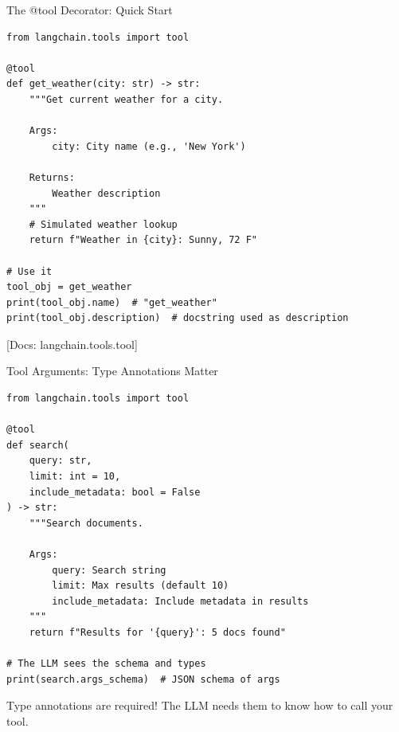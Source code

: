 \documentclass[aspectratio=169,11pt]{beamer}
\newcommand{\docref}[1]{{\scriptsize\color{docgray}[Docs: #1]}}
\begin{document}
\begin{frame}[fragile]{The @tool Decorator: Quick Start}
\begin{codebox}
\begin{lstlisting}
from langchain.tools import tool

@tool
def get_weather(city: str) -> str:
    """Get current weather for a city.

    Args:
        city: City name (e.g., 'New York')

    Returns:
        Weather description
    """
    # Simulated weather lookup
    return f"Weather in {city}: Sunny, 72 F"

# Use it
tool_obj = get_weather
print(tool_obj.name)  # "get_weather"
print(tool_obj.description)  # docstring used as description
\end{lstlisting}
\end{codebox}

\textcolor{docgray}{\docref{langchain.tools.tool}}
\end{frame}

\begin{frame}[fragile]{Tool Arguments: Type Annotations Matter}
\begin{codebox}
\begin{lstlisting}
from langchain.tools import tool

@tool
def search(
    query: str,
    limit: int = 10,
    include_metadata: bool = False
) -> str:
    """Search documents.

    Args:
        query: Search string
        limit: Max results (default 10)
        include_metadata: Include metadata in results
    """
    return f"Results for '{query}': 5 docs found"

# The LLM sees the schema and types
print(search.args_schema)  # JSON schema of args
\end{lstlisting}
\end{codebox}

\begin{warningbox}[Important]
Type annotations are required! The LLM needs them to know how to call your tool.
\end{warningbox}
\end{frame}
\end{document}
